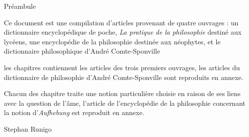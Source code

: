 
\thispagestyle{empty}

\begin{center}
\Large
Préambule
\normalsize
\end{center}
\vspace{3cm}


Ce document est une compilation d'articles provenant de quatre ouvrages : un dictionnaire encyclopédique de poche, {\it La pratique de la philosophie} destiné aux lycéens, une encyclopédie de la philosophie destinée aux néophytes, et le dictionnaire philosophique d'André Comte-Sponville

\vspace{1.3cm}

les chapitres contiennent les articles des trois premiers ouvrages, les articles du dictionnaire de philosophie d'André Comte-Sponville sont reproduits en annexe.

Chacun des chapitre traite une notion particulière choisie en raison de ses liens avec la question de l'âme,
l'article de l'encyclopédie de la philosophie concernant la notion d'{\it Aufhebung} est reproduit en annexe.



\vspace{1.3cm}


\vspace{1.3cm}


\vspace{2.3cm}

\hfill Stephan Runigo

